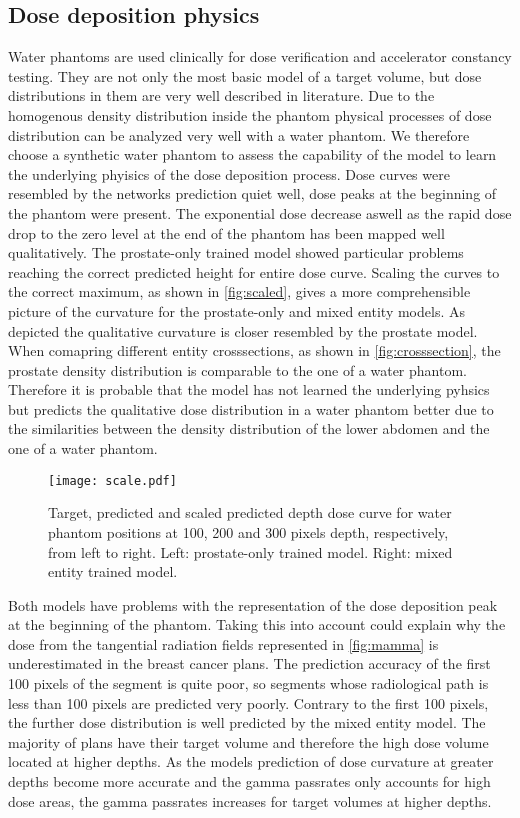\subsection{Dose deposition physics}

Water phantoms are used clinically for dose verification and accelerator constancy testing.
They are not only the most basic model of a target volume, but dose distributions in them are very well described in literature.
Due to the homogenous density distribution inside the phantom physical processes of dose distribution can be analyzed very well with a water phantom.
We therefore choose a synthetic water phantom to assess the capability of the model to learn the underlying phyisics of the dose deposition process.
Dose curves were resembled by the networks prediction quiet well, dose peaks at the beginning of the phantom were present. 
The exponential dose decrease aswell as the rapid dose drop to the zero level at the end of the phantom has been mapped well qualitatively.
The prostate-only trained model showed particular problems reaching the correct predicted height for entire dose curve.
Scaling the curves to the correct maximum, as shown in \autoref{fig:scaled}, gives a more comprehensible picture of the curvature for the prostate-only and mixed entity models.
As depicted the qualitative curvature is closer resembled by the prostate model. 
When comapring different entity crosssections, as shown in \autoref{fig:crosssection}, the prostate density distribution is comparable to the one of a water phantom. 
Therefore it is probable that the model has not learned the underlying pyhsics but predicts the qualitative dose distribution in a water phantom better due to the similarities between the density distribution of the lower abdomen and the one of a water phantom.

\begin{figure}
    \centering
    \texttt{[image: scale.pdf]}
    \caption{
        Target, predicted and scaled predicted depth dose curve for water phantom positions at 100, 200 and 300 pixels depth, respectively, from left to right. Left: prostate-only trained model. Right: mixed entity trained model. 
    }\label{fig:scaled}
\end{figure}

Both models have problems with the representation of the dose deposition peak at the beginning of the phantom.
Taking this into account could explain why the dose from the tangential radiation fields represented in \autoref{fig:mamma} is underestimated in the breast cancer plans.
The prediction accuracy of the first 100 pixels of the segment is quite poor, so segments whose radiological path is less than 100 pixels are predicted very poorly.
Contrary to the first 100 pixels, the further dose distribution is well predicted by the mixed entity model.
The majority of plans have their target volume and therefore the high dose volume located at higher depths.
As the models prediction of dose curvature at greater depths become more accurate and the gamma passrates only accounts for high dose areas, the gamma passrates increases for target volumes at higher depths.

